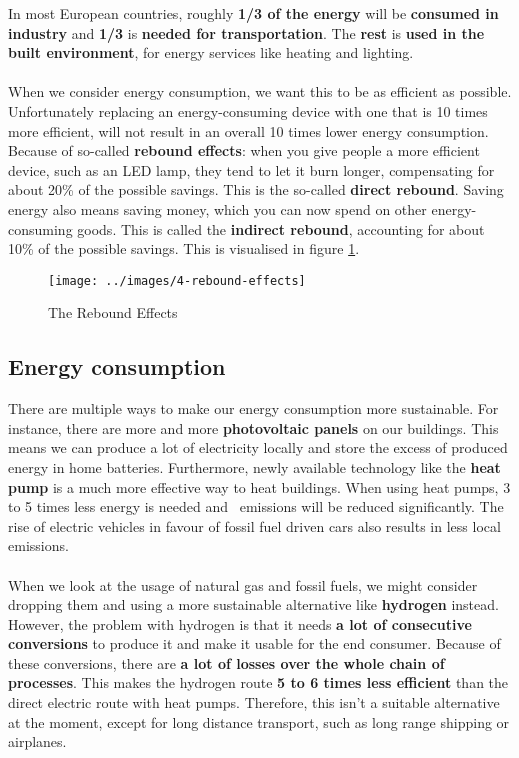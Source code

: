 \documentclass[../summary.tex]{subfiles}
\begin{document}
In most European countries, roughly \textbf{1/3 of the energy} will be \textbf{consumed in industry} and \textbf{1/3} is \textbf{needed for transportation}. The \textbf{rest} is \textbf{used in the built environment}, for energy services like heating and lighting.
\\\\
When we consider energy consumption, we want this to be as efficient as possible. Unfortunately replacing an energy-consuming device with one that is 10 times more efficient, will not result in an overall 10 times lower energy consumption. Because of so-called \textbf{rebound effects}: when you give people a more efficient device, such as an LED lamp, they tend to let it burn longer, compensating for about 20\% of the possible savings. This is the so-called \textbf{direct rebound}. Saving energy also means saving money, which you can now spend on other energy-consuming goods. This is called the \textbf{indirect rebound}, accounting for about 10\% of the possible savings. This is visualised in figure \ref{fig:rebound-effects}.

\begin{figure}[H]
	\centering
	\texttt{[image: ../images/4-rebound-effects]}
	\caption{The Rebound Effects}
	\label{fig:rebound-effects}
\end{figure}

\subsection{Energy consumption}

There are multiple ways to make our energy consumption more sustainable. For instance, there are more and more \textbf{photovoltaic panels} on our buildings. This means we can produce a lot of electricity locally and store the excess of produced energy in home batteries. Furthermore, newly available technology like the \textbf{heat pump} is a much more effective way to heat buildings. When using heat pumps, 3 to 5 times less energy is needed and \COtwo\ emissions will be reduced significantly. The rise of electric vehicles in favour of fossil fuel driven cars also results in less local emissions.
\\\\
When we look at the usage of natural gas and fossil fuels, we might consider dropping them and using a more sustainable alternative like \textbf{hydrogen} instead. However, the problem with hydrogen is that it needs \textbf{a lot of consecutive conversions} to produce it and make it usable for the end consumer. Because of these conversions, there are \textbf{a lot of losses over the whole chain of processes}. This makes the hydrogen route \textbf{5 to 6 times less efficient} than the direct electric route with heat pumps. Therefore, this isn't a suitable alternative at the moment, except for long distance transport, such as long range shipping or airplanes.
\end{document}

